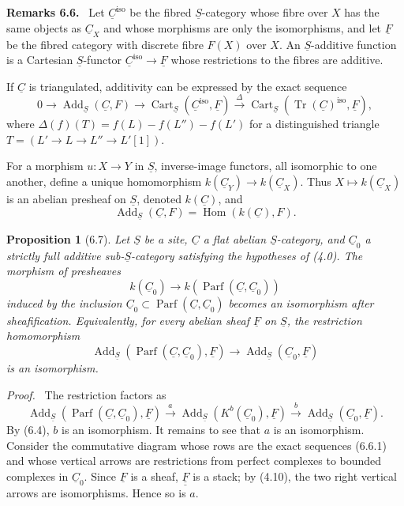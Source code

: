 \documentclass[13pt]{extarticle}
\newcommand{\uS}{\underline S}
\newcommand{\uC}{\underline C}
\newcommand{\uF}{\underline F}
\newcommand{\Tr}{\operatorname{Tr}}
\newcommand{\Hom}{\operatorname{Hom}}
\newcommand{\Parf}{\operatorname{Parf}}
\newcommand{\Cart}{\operatorname{Cart}}
\newcommand{\Add}{\operatorname{Add}}
\newenvironment{statement}[1]{\par\medskip\noindent\textbf{#1.}\ }{\par\medskip}
\newenvironment{prooftext}[1][Proof]{\par\noindent\emph{#1.}\ }{\par\medskip}
\newtheorem*{proposition*}{Proposition}
\begin{document}
\begin{statement}{Remarks 6.6}
Let $\uC^{\mathrm{iso}}$ be the fibred $\uS$-category whose fibre over $X$ has the same objects as $\uC_X$ and whose morphisms are only the isomorphisms, and let $\underline F$ be the fibred category with discrete fibre $F(X)$ over $X$. An $\uS$-additive function is a Cartesian $\uS$-functor $\uC^{\mathrm{iso}}\to\underline F$ whose restrictions to the fibres are additive.

If $\uC$ is triangulated, additivity can be expressed by the exact sequence
\[
0\longrightarrow\Add_{\uS}(\uC,F)
\longrightarrow\Cart_{\uS}(\uC^{\mathrm{iso}},\underline F)
\xrightarrow{\Delta}
\Cart_{\uS}(\Tr(\uC)^{\mathrm{iso}},\underline F),
\tag{6.6.1}
\]
where $\Delta(f)(T)=f(L)-f(L'')-f(L')$ for a distinguished triangle $T=(L'\to L\to L''\to L'[1])$.

For a morphism $u:X\to Y$ in $\uS$, inverse-image functors, all isomorphic to one another, define a unique homomorphism $k(\uC_Y)\to k(\uC_X)$. Thus $X\mapsto k(\uC_X)$ is an abelian presheaf on $\uS$, denoted $k(\uC)$, and
\[
\Add_{\uS}(\uC,F)=\Hom(k(\uC),F).
\]
\end{statement}

\begin{proposition*}[6.7]
Let $\uS$ be a site, $\uC$ a flat abelian $\uS$-category, and $\uC_0$ a strictly full additive sub-$\uS$-category satisfying the hypotheses of (4.0). The morphism of presheaves
\[
k(\uC_0)\longrightarrow k(\Parf(\uC,\uC_0))
\]
induced by the inclusion $\uC_0\subset\Parf(\uC,\uC_0)$ becomes an isomorphism after sheafification. Equivalently, for every abelian sheaf $\uF$ on $\uS$, the restriction homomorphism
\[
\Add_{\uS}(\Parf(\uC,\uC_0),\uF)
\longrightarrow
\Add_{\uS}(\uC_0,\uF)
\]
is an isomorphism.
\end{proposition*}

\begin{prooftext}
The restriction factors as
\[
\Add_{\uS}(\Parf(\uC,\uC_0),\uF)
\xrightarrow{a}
\Add_{\uS}(K^b(\uC_0),\uF)
\xrightarrow{b}
\Add_{\uS}(\uC_0,\uF).
\]
By (6.4), $b$ is an isomorphism. It remains to see that $a$ is an isomorphism. Consider the commutative diagram whose rows are the exact sequences (6.6.1) and whose vertical arrows are restrictions from perfect complexes to bounded complexes in $\uC_0$. Since $\uF$ is a sheaf, $\underline{\uF}$ is a stack; by (4.10), the two right vertical arrows are isomorphisms. Hence so is $a$.
\end{prooftext}
\end{document}
